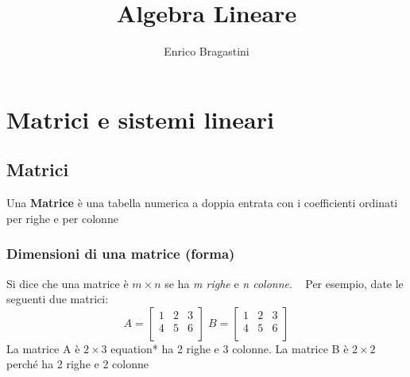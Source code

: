 \documentclass[12pt,oneside]{book}
\title{\Large{\textbf{Algebra Lineare}}}
\author{Enrico Bragastini}
\begin{document}
\pagestyle{fancy}
\fancyhf{}
\rhead{}
\lhead{\nouppercase\leftmark}
\cfoot{\thepage}
\frontmatter

\maketitle
\tableofcontents

\mainmatter
\chapter{Matrici e sistemi lineari}

\section{Matrici}
Una \textbf{Matrice} è una tabella numerica a doppia entrata con i coefficienti ordinati per righe
e per colonne

\subsection{Dimensioni di una matrice (forma)}
Si dice che una matrice è $m \times n$ se ha \emph{m righe} e \emph{n colonne}.
~\newline
Per esempio, date le seguenti due matrici:
\begin{equation*}
    A =
    \begin{bmatrix}
        1 & 2 & 3 \\
        4 & 5 & 6 \\
    \end{bmatrix}
    \; B =
    \begin{bmatrix}
        1 & 2 & 3 \\
        4 & 5 & 6 \\
    \end{bmatrix}
\end{equation*}
La matrice A è $2 \times 3$ equation* ha 2 righe e 3 colonne. \newline La matrice B è $2 \times 2$ perché ha 2 righe
e 2 colonne
\end{document}
